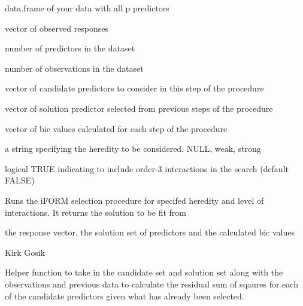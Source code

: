 \documentclass[letterpaper]{book}
\begin{document}
%
\begin{Arguments}
\begin{ldescription}
\item[\code{x}] data.frame of your data with all p predictors

\item[\code{y}] vector of observed responses

\item[\code{p}] number of predictors in the dataset

\item[\code{n}] number of observations in the dataset

\item[\code{C}] vector of candidate predictors to consider in this step of the procedure

\item[\code{S}] vector of solution predictor selected from previous steps of the procedure

\item[\code{bic}] vector of bic values calculated for each step of the procedure

\item[\code{heredity}] a string specifying the heredity to be considered. NULL, weak, strong

\item[\code{higher\_order}] logical TRUE indicating to include order-3 interactions in the search (default FALSE)
\end{ldescription}
\end{Arguments}
%
\begin{Details}\relax
Runs the iFORM selection procedure for specifed heredity and level of interactions.
It returns the solution to be fit from 
\end{Details}
%
\begin{Value}
the response vector, the solution set of predictors and the calculated bic values
\end{Value}
%
\begin{Author}\relax
Kirk Gosik
\end{Author}
%
\begin{Description}\relax
Helper function to take in the candidate set and solution set along with the observations
and previous data to calculate the residual sum of sqaures for each of the candidate
predictors given what has already been selected.
\end{Description}
\end{document}
